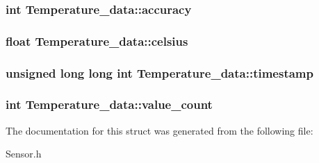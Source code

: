 \subsubsection[{accuracy}]{\setlength{\rightskip}{0pt plus 5cm}int Temperature\-\_\-data\-::accuracy}\label{structTemperature__data_a086c83e758be545e7878ea7c4fe98f23}
\subsubsection[{celsius}]{\setlength{\rightskip}{0pt plus 5cm}float Temperature\-\_\-data\-::celsius}\label{structTemperature__data_a989ee315359e368db60feedf2cc757b5}
\subsubsection[{timestamp}]{\setlength{\rightskip}{0pt plus 5cm}unsigned long long int Temperature\-\_\-data\-::timestamp}\label{structTemperature__data_a162bed85d7ec6f68285d6b7421a2a507}
\subsubsection[{value\-\_\-count}]{\setlength{\rightskip}{0pt plus 5cm}int Temperature\-\_\-data\-::value\-\_\-count}\label{structTemperature__data_a1cb36d1b40a8eea0d86d8228600b6284}


The documentation for this struct was generated from the following file\-:\begin{DoxyCompactItemize}
\item 
Sensor.\-h\end{DoxyCompactItemize}
